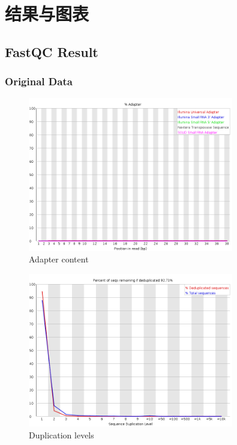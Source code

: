 \documentclass[UTF8]{ctexart}
\begin{document}
\section{结果与图表}

\subsection{FastQC Result}

\subsubsection{Original Data}

\begin{figure}[!htb]
	\centering
	\includegraphics[width=0.8\textwidth]{img/SRR14325859_FastQC_Origin_img/adapter_content.png}	
	\caption{Adapter content\protect}    
\end{figure}

\begin{figure}[!htb]
	\centering
	\includegraphics[width=0.8\textwidth]{img/SRR14325859_FastQC_Origin_img/duplication_levels.png}	
	\caption{Duplication levels\protect}    
\end{figure}
\end{document}
